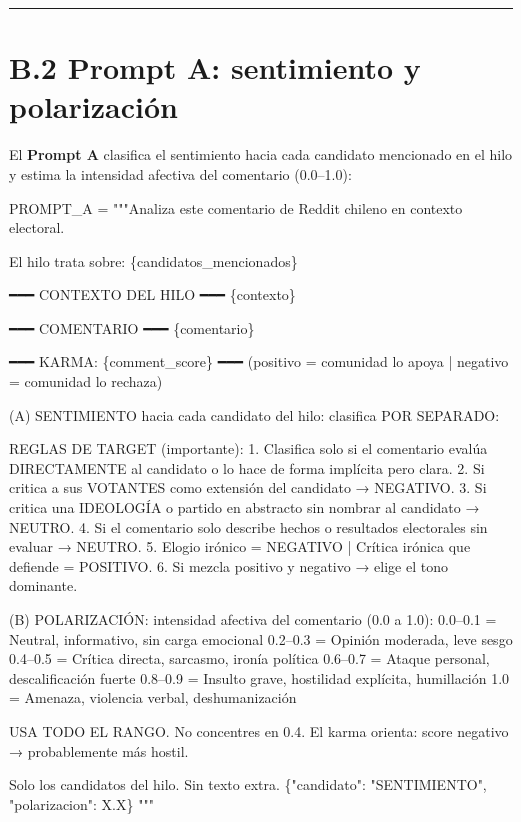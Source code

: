 \documentclass[
  letterpaper,
  numbers=noendperiod,
  fontsize=11pt,
  DIV=12,
  titlepage=false]{scrreprt}
\newenvironment{Shaded}{\begin{snugshade}}{\end{snugshade}}
\newcommand{\NormalTok}[1]{\textcolor[rgb]{0.00,0.23,0.31}{#1}}
\newcommand{\OperatorTok}[1]{\textcolor[rgb]{0.37,0.37,0.37}{#1}}
\newcommand{\SpecialCharTok}[1]{\textcolor[rgb]{0.37,0.37,0.37}{#1}}
\newcommand{\StringTok}[1]{\textcolor[rgb]{0.13,0.47,0.30}{#1}}
\begin{document}
\begin{center}\rule{0.5\linewidth}{0.5pt}\end{center}

\section{B.2 Prompt A: sentimiento y
polarización}\label{b.2-prompt-a-sentimiento-y-polarizaciuxf3n}

El \textbf{Prompt A} clasifica el sentimiento hacia cada candidato
mencionado en el hilo y estima la intensidad afectiva del comentario
(0.0--1.0):

\begin{Shaded}
\begin{Highlighting}[]
\NormalTok{PROMPT\_A }\OperatorTok{=} \StringTok{"""Analiza este comentario de Reddit chileno en contexto electoral.}

\StringTok{El hilo trata sobre: }\SpecialCharTok{\{candidatos\_mencionados\}}

\StringTok{━━━ CONTEXTO DEL HILO ━━━}
\SpecialCharTok{\{contexto\}}

\StringTok{━━━ COMENTARIO ━━━}
\SpecialCharTok{\{comentario\}}

\StringTok{━━━ KARMA: }\SpecialCharTok{\{comment\_score\}}\StringTok{ ━━━}
\StringTok{(positivo = comunidad lo apoya | negativo = comunidad lo rechaza)}

\StringTok{(A) SENTIMIENTO hacia cada candidato del hilo: clasifica POR SEPARADO:}

\StringTok{REGLAS DE TARGET (importante):}
\StringTok{1. Clasifica solo si el comentario evalúa DIRECTAMENTE al candidato}
\StringTok{   o lo hace de forma implícita pero clara.}
\StringTok{2. Si critica a sus VOTANTES como extensión del candidato → NEGATIVO.}
\StringTok{3. Si critica una IDEOLOGÍA o partido en abstracto sin nombrar al candidato → NEUTRO.}
\StringTok{4. Si el comentario solo describe hechos o resultados electorales sin evaluar → NEUTRO.}
\StringTok{5. Elogio irónico = NEGATIVO | Crítica irónica que defiende = POSITIVO.}
\StringTok{6. Si mezcla positivo y negativo → elige el tono dominante.}

\StringTok{(B) POLARIZACIÓN: intensidad afectiva del comentario (0.0 a 1.0):}
\StringTok{0.0–0.1 = Neutral, informativo, sin carga emocional}
\StringTok{0.2–0.3 = Opinión moderada, leve sesgo}
\StringTok{0.4–0.5 = Crítica directa, sarcasmo, ironía política}
\StringTok{0.6–0.7 = Ataque personal, descalificación fuerte}
\StringTok{0.8–0.9 = Insulto grave, hostilidad explícita, humillación}
\StringTok{1.0     = Amenaza, violencia verbal, deshumanización}

\StringTok{USA TODO EL RANGO. No concentres en 0.4.}
\StringTok{El karma orienta: score negativo → probablemente más hostil.}

\StringTok{Solo los candidatos del hilo. Sin texto extra.}
\StringTok{\{"candidato": "SENTIMIENTO", "polarizacion": X.X\}}
\StringTok{"""}
\end{Highlighting}
\end{Shaded}
\end{document}
